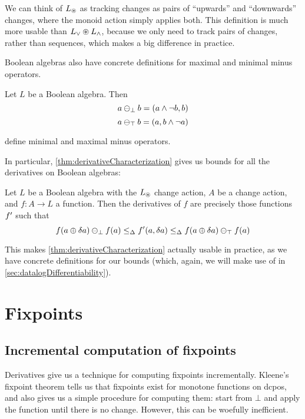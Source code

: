 We can think of $L_\circledast$ as tracking changes as pairs of ``upwards'' and
``downwards'' changes, where the monoid action simply applies both. This
definition is much more usable than $L_\vee \circledast L_\wedge$, because we
only need to track pairs of changes, rather than sequences, which makes a big
difference in practice.

Boolean algebras also have concrete definitions for maximal and minimal minus
operators.

\begin{prop}
  Let $L$ be a Boolean algebra. Then
  $$a \ominus_\bot b = (a \wedge \neg b, b)$$
  $$a \ominus_\top b = (a, b \wedge \neg a)$$

  define minimal and maximal minus operators.
\end{prop}

In particular, \cref{thm:derivativeCharacterization} gives us bounds for
all the derivatives on Boolean algebras:

\begin{corollary}
\label{cor:booleanCharacterization}
  Let $L$ be a Boolean algebra with the $L_\circledast$ change action, $A$ be
  a change action, and $f: A \rightarrow
  L$ a function. Then the derivatives of $f$ are precisely those functions
  $f'$ such that
  $$
  f(a \oplus \delta a) \ominus_\bot f(a)
  \leq_\Delta
  f'(a, \delta a)
  \leq_\Delta
  f(a \oplus \delta a) \ominus_\top f(a)
  $$
\end{corollary}

This makes \cref{thm:derivativeCharacterization} actually usable in practice, as
we have concrete definitions for our bounds (which, again, we will make use of in \cref{sec:datalogDifferentiability}).

\section{Fixpoints}
\label{sec:fixpoints}

\subsection{Incremental computation of fixpoints}

Derivatives give us a technique for computing fixpoints incrementally. Kleene's
fixpoint theorem tells us that fixpoints exist for monotone functions on dcpos, and also gives us
a simple procedure for computing them: start from $\bot$ and apply the function
until there is no change. However, this can be woefully inefficient.

